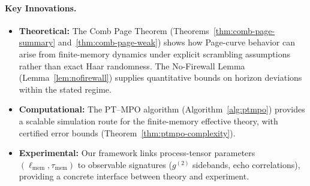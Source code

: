 \documentclass[a4paper,11pt]{article}
\newcommand{\ellmem}{\ensuremath{\ell_{\mathrm{mem}}}}
\newcommand{\taumem}{\ensuremath{\tau_{\mathrm{mem}}}}
\theoremstyle{plain}
\theoremstyle{definition}
\theoremstyle{remark}
\begin{document}
\paragraph{Key Innovations.}
\begin{itemize}[leftmargin=*]
\item \textbf{Theoretical:} The Comb Page Theorem (Theorems~\ref{thm:comb-page-summary} and~\ref{thm:comb-page-weak}) shows how Page-curve behavior can arise from finite-memory dynamics under explicit scrambling assumptions rather than exact Haar randomness. The No-Firewall Lemma (Lemma~\ref{lem:nofirewall}) supplies quantitative bounds on horizon deviations within the stated regime.

\item \textbf{Computational:} The PT--MPO algorithm (Algorithm~\ref{alg:ptmpo}) provides a scalable simulation route for the finite-memory effective theory, with certified error bounds (Theorem~\ref{thm:ptmpo-complexity}).

\item \textbf{Experimental:} Our framework links process-tensor parameters $(\ellmem, \taumem)$ to observable signatures ($g^{(2)}$ sidebands, echo correlations), providing a concrete interface between theory and experiment.
\end{itemize}
\end{document}
